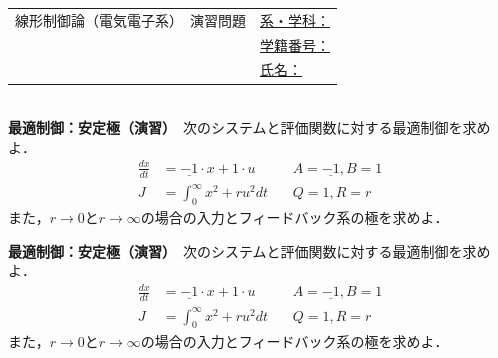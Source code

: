 \documentclass[a4paper,11pt]{jreport}
\begin{document}
\newpage

\begin{tabular}{cl}
\hspace*{2cm}
{\large 線形制御論（電気電子系）　演習問題}
\hspace{1cm}
&
\underline{系・学科：\hspace{3cm}}
\\[2mm]
&\underline{学籍番号：\hspace{3cm}}
\\[2mm]
&\underline{氏名：\hspace{5cm}}
\end{tabular}
\ \\

\noindent
{\bf 最適制御：安定極（演習）}　次のシステムと評価関数に対する最適制御を求めよ．
\begin{align*}
	\frac{dx}{dt} & = \underline{-1} \cdot x + 1 \cdot u \ \ \ \ \ \ \ \ \ \ \ \ A=\underline{-1},B=1\\
	J & = \int_0^{\infty} x^2 + r u^2 dt \ \ \ \ \ \ \ \ Q=1,R=r
\end{align*}
また，$r\rightarrow 0$と$r\rightarrow \infty$の場合の入力とフィードバック系の極を求めよ．




\newpage

\noindent
{\bf 最適制御：安定極（演習）}　次のシステムと評価関数に対する最適制御を求めよ．
\begin{align*}
	\frac{dx}{dt} & =\underline{-1} \cdot x + 1 \cdot u \ \ \ \ \ \ \ \ \ \ \ \ A=\underline{-1},B=1\\
	J & = \int_0^{\infty} x^2 + r u^2 dt \ \ \ \ \ \ \ \ Q=1,R=r
\end{align*}
また，$r\rightarrow 0$と$r\rightarrow \infty$の場合の入力とフィードバック系の極を求めよ．
\\
\end{document}
